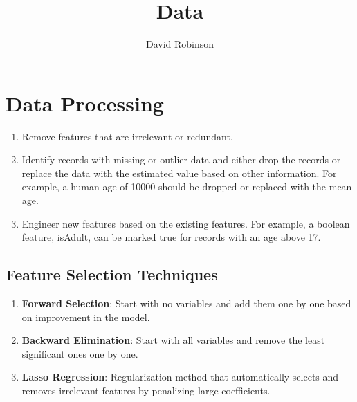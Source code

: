 \documentclass{article}
\title{Data}
\author{David Robinson}
\date{}
\begin{document}
\maketitle

\section*{Data Processing}

\begin{enumerate}
    \item Remove features that are irrelevant or redundant.
    \item Identify records with missing or outlier data and either drop the records or replace the data with the estimated value based on other information. For example, a human age of 10000 should be dropped or replaced with the mean age.
    \item Engineer new features based on the existing features. For example, a boolean feature, isAdult, can be marked true for records with an age above 17.
\end{enumerate}

\subsection*{Feature Selection Techniques}
\begin{enumerate}
    \item \textbf{Forward Selection}: Start with no variables and add them one by one based on improvement in the model.
    \item \textbf{Backward Elimination}: Start with all variables and remove the least significant ones one by one.
    \item \textbf{Lasso Regression}: Regularization method that automatically selects and removes irrelevant features by penalizing large coefficients.
\end{enumerate}
\end{document}
